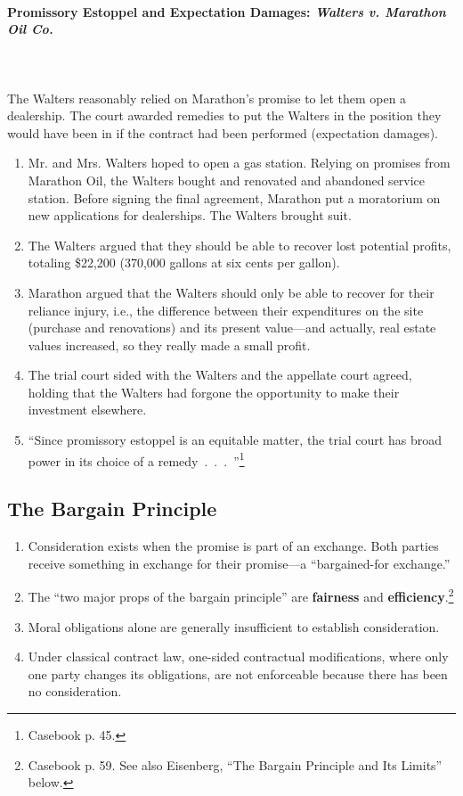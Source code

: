 \paragraph{Promissory Estoppel and Expectation Damages: \emph{Walters v. 
Marathon Oil Co.}}
~\\\\
The Walters reasonably relied on Marathon's promise to let them open a 
dealership. The court awarded remedies to put the Walters in the position they 
would have been in if the contract had been performed (expectation damages).

\begin{enumerate}
    \item Mr. and Mrs. Walters hoped to open a gas station. Relying on 
    promises from Marathon Oil, the Walters bought and renovated and abandoned 
    service station. Before signing the final agreement, Marathon put a 
    moratorium on new applications for dealerships. The Walters brought suit.
    \item The Walters argued that they should be able to recover lost 
    potential profits, totaling \$22,200 (370,000 gallons at six cents per 
    gallon).
    \item Marathon argued that the Walters should only be able to recover for 
    their reliance injury, i.e., the difference between their expenditures on 
    the site (purchase and renovations) and its present value---and actually, 
    real estate values increased, so they really made a small profit.
    \item The trial court sided with the Walters and the appellate court 
    agreed, holding that the Walters had forgone the opportunity to make their 
    investment elsewhere.
    \item ``Since promissory estoppel is an equitable matter, the trial court 
    has broad power in its choice of a remedy~.~.~.~''\footnote{Casebook p. 
    45.}
\end{enumerate}

\subsection{The Bargain Principle} 

\begin{enumerate}
    \item Consideration exists when the promise is part of an exchange. Both 
    parties receive something in exchange for their promise---a 
    ``bargained-for exchange.''
    \item The ``two major props of the bargain principle'' are 
    \textbf{fairness} and \textbf{efficiency}.\footnote{Casebook p. 59. See 
    also Eisenberg, ``The Bargain Principle and Its Limits'' below.}
    \item Moral obligations alone are generally insufficient to establish 
    consideration.
    \item Under classical contract law, one-sided contractual modifications, 
    where only one party changes its obligations, are not enforceable because 
    there has been no consideration.
\end{enumerate}


